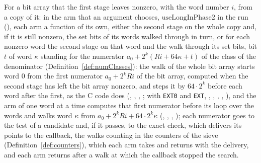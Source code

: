 \begin{definition}\label{def:siftBitArray}
  \leanok
  For a bit array that the first stage leaves nonzero, with the word number $i$, from a copy of it:
  in the arm that an argument chooses, $\mathrm{useLongInPhase2}$ in the run
  (), each arm a function of its own, either the second stage on the
  whole copy and, if it is still nonzero, the set bits of its words walked through in turn, or for
  each nonzero word the second stage on that word and the walk through its set bits, bit $t$ of word
  $\kappa$ standing for the numerator $a_0 + 2^k (R i + 64 \kappa + t)$ of the class of the
  denominator (Definition~\ref{def:numClasses}): the walk of the whole bit array starts word $0$
  from the first numerator $a_0 + 2^k R i$ of the bit array, computed when the second stage has left
  the bit array nonzero, and steps it by $64 \cdot 2^k$ before each word after the first, as the C
  code does (, ,
  , ; with \verb|EXT0| and \verb|EXT|,
  , ,
  , ,
  ), and the arm of one word at a time computes that first numerator
  before its loop over the words and walks word $\kappa$ from $a_0 + 2^k R i + 64 \cdot 2^k \kappa$
  (, , ,
  ); each numerator goes to the test of a candidate and, if it passes,
  to the exact check, which delivers its points to the callback, the walks counting in the counters
  of the sieve (Definition~\ref{def:counters}), which each arm takes and returns with the delivery,
  and each arm returns after a walk at which the callback stopped the search.
\end{definition}

